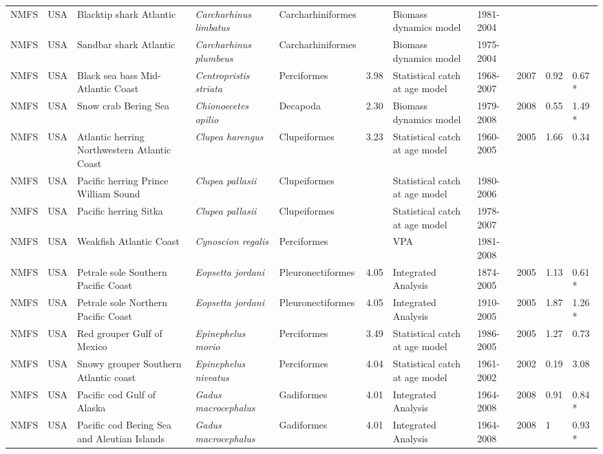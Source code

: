 \begin{longtable}{p{1.5cm}p{1.5cm}p{3cm}p{3cm}p{2.5cm}p{0.9cm}p{1.4cm}p{0.9cm}p{0.9cm}p{0.9cm}p{1cm}}
  NMFS & USA & Blacktip shark Atlantic & \textit{Carcharhinus limbatus} & Carcharhiniformes &  & Biomass dynamics model & 1981-2004 &  &  &  \\ 
  NMFS & USA & Sandbar shark Atlantic & \textit{Carcharhinus plumbeus} & Carcharhiniformes &  & Biomass dynamics model & 1975-2004 &  &  &  \\ 
  NMFS & USA & Black sea bass Mid-Atlantic Coast & \textit{Centropristis striata} & Perciformes & 3.98 & Statistical catch at age model & 1968-2007 & 2007 & 0.92 & 0.67 * \\ 
  NMFS & USA & Snow crab Bering Sea & \textit{Chionoecetes opilio} & Decapoda & 2.30 & Biomass dynamics model & 1979-2008 & 2008 & 0.55 & 1.49 * \\ 
  NMFS & USA & Atlantic herring Northwestern Atlantic Coast & \textit{Clupea harengus} & Clupeiformes & 3.23 & Statistical catch at age model & 1960-2005 & 2005 & 1.66 & 0.34 \\ 
  NMFS & USA & Pacific herring Prince William Sound & \textit{Clupea pallasii} & Clupeiformes &  & Statistical catch at age model & 1980-2006 &  &  &  \\ 
  NMFS & USA & Pacific herring Sitka & \textit{Clupea pallasii} & Clupeiformes &  & Statistical catch at age model & 1978-2007 &  &  &  \\ 
  NMFS & USA & Weakfish Atlantic Coast & \textit{Cynoscion regalis} & Perciformes &  & VPA & 1981-2008 &  &  &  \\ 
  NMFS & USA & Petrale sole Southern Pacific Coast & \textit{Eopsetta jordani} & Pleuronectiformes & 4.05 & Integrated Analysis & 1874-2005 & 2005 & 1.13 & 0.61 * \\ 
  NMFS & USA & Petrale sole Northern Pacific Coast & \textit{Eopsetta jordani} & Pleuronectiformes & 4.05 & Integrated Analysis & 1910-2005 & 2005 & 1.87 & 1.26 * \\ 
  NMFS & USA & Red grouper Gulf of Mexico & \textit{Epinephelus morio} & Perciformes & 3.49 & Statistical catch at age model & 1986-2005 & 2005 & 1.27 & 0.73 \\ 
  NMFS & USA & Snowy grouper Southern Atlantic coast & \textit{Epinephelus niveatus} & Perciformes & 4.04 & Statistical catch at age model & 1961-2002 & 2002 & 0.19 & 3.08 \\ 
  NMFS & USA & Pacific cod Gulf of Alaska & \textit{Gadus macrocephalus} & Gadiformes & 4.01 & Integrated Analysis & 1964-2008 & 2008 & 0.91 & 0.84 * \\ 
  NMFS & USA & Pacific cod Bering Sea and Aleutian Islands & \textit{Gadus macrocephalus} & Gadiformes & 4.01 & Integrated Analysis & 1964-2008 & 2008 & 1 & 0.93 * \\ 

\end{longtable}
